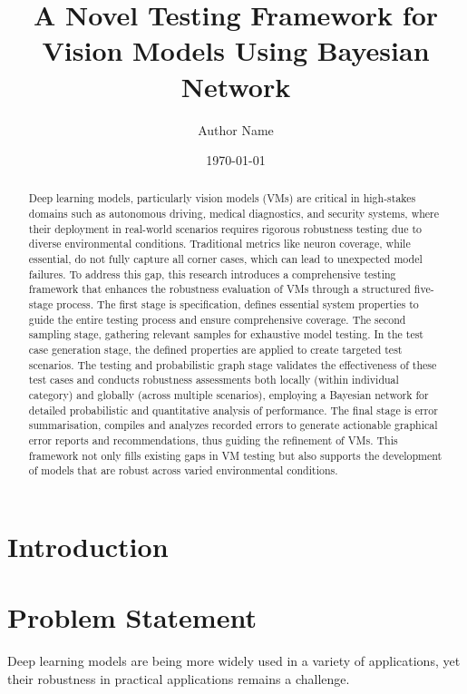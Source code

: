 \documentclass[10pt, conference, a4paper, final]{IEEEtran}
\title{ A Novel Testing Framework for Vision Models Using Bayesian Network}
\author{Author Name}
\date{\today}
\begin{document}
\maketitle

\begin{abstract}

    Deep learning models, particularly vision models (VMs) are critical in high-stakes domains such as autonomous driving, medical diagnostics, and security systems, where their deployment in real-world scenarios requires rigorous robustness testing due to diverse environmental conditions. Traditional metrics like neuron coverage, while essential, do not fully capture all corner cases, which can lead to unexpected model failures. To address this gap, this research introduces a comprehensive testing framework that enhances the robustness evaluation of VMs through a structured five-stage process. The first stage is specification, defines essential system properties to guide the entire testing process and ensure comprehensive coverage. The second sampling stage, gathering relevant samples for exhaustive model testing. In the test case generation stage, the defined properties are applied to create targeted test scenarios. The testing and probabilistic graph stage validates the effectiveness of these test cases and conducts robustness assessments both locally (within individual category) and globally (across multiple scenarios), employing a Bayesian network for detailed probabilistic and quantitative analysis of performance. The final stage is error summarisation, compiles and analyzes recorded errors to generate actionable graphical error reports and recommendations, thus guiding the refinement of VMs. This framework not only fills existing gaps in VM testing but also supports the development of models that are robust across varied environmental conditions.
\end{abstract}


\section{Introduction}

\section{Problem Statement}

Deep learning models are being more widely used in a variety of applications, yet their robustness in practical applications remains a challenge.
\end{document}
